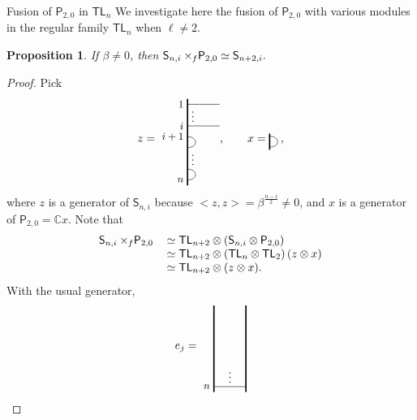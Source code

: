 \documentclass[reqno]{amsart}
\newtheorem{Prop}[Thm]{Proposition}
\newcommand{\tl}[1]{\mathsf{TL}_{#1}}
\newcommand{\ds}[1]{\mathsf S_{#1}}
\newcommand{\dP}[1]{\mathsf P_{#1}}
\newcommand{\xf}{\times\hspace{-0.27em}_f}
\newcommand{\lc}{\ell}
\begin{document}
\begin{section}{Fusion of $\dP{2,0}$ in $\tl{n}$}\label{sec:magicp2}
We investigate here the fusion of $\dP{2,0}$ with various modules in the regular family $\tl{n}$ when $\lc \neq 2$.
\begin{Prop}\label{prop:magickSP2}
If $\beta \neq 0$, then $\ds{n,i} \xf \dP{2,0} \simeq \ds{n+2,i}.$
\end{Prop}
\begin{proof}
Pick 
\begin{equation*}
z = \begin{tikzpicture}[baseline={(current bounding box.center)}, scale=1/3]
		\draw[very thick] (0,-1/2) -- (0,15/2);
			\draw (0,0) .. controls (1,0) and (1,1) .. (0,1);
				\node[anchor = south] at (1/2,1) {$\vdots$};
			\draw (0,3) .. controls (1,3) and (1,4) .. (0,4);
			\draw (0,5) -- (3,5);
				\node[anchor = south] at (1/2,5) {$\vdots$};
			\draw (0,7) -- (3,7);
				\node[anchor = east] at (0,7) {\small{$1$}};
				\node[anchor = east] at (0,5) {\small{$i$}};
				\node[anchor = east] at (0,4) {\small{$i+1$}};
				\node[anchor = east] at (0,0) {\small{$n$}};
\end{tikzpicture}, \qquad x = \begin{tikzpicture}[baseline= {(current bounding box.center)},scale = 1/3]
%
	\draw[very thick] (0,-3/4) -- (0,3/4);
	\draw (0,-1/2) .. controls (1,-1/2) and (1,1/2) .. (0,1/2);
%
\end{tikzpicture}, 
\end{equation*}
where $z$ is a generator of $\ds{n,i}$ because $<z,z> = \beta^{\frac{n-i}{2}} \neq 0$, and $x$ is a generator of $\dP{2,0} = \mathbb{C}x$. Note that
\begin{equation}
\begin{tabular}{r l}
	$\ds{n,i} \xf \dP{2,0}$&$ \simeq \tl{n+2} \otimes \left(\ds{n,i} \otimes \dP{2,0}\right)$\\
	&$	\simeq \tl{n+2} \otimes \left(\tl{n}\otimes \tl{2} \right)(z \otimes x )$\\
 & $\simeq \tl{n+2} \otimes \left(z \otimes x \right)$.
\end{tabular}
\end{equation}
With the usual generator,
\begin{equation}
e_{j}=
	\begin{tikzpicture}[baseline={(current bounding box.center)}, scale=1/3]
		\draw[very thick] (0,-1/2) -- (0,15/2);
		\draw[very thick] (3,-1/2) -- (3,15/2);
		\draw (0,0) -- (3,0);
			\node[anchor = east] at (0,0) {\small{$n$}};
			\node[anchor = south] at (3/2,0) {$\vdots$};

\end{tikzpicture}
\end{equation}
\end{proof}
\end{section}
\end{document}
